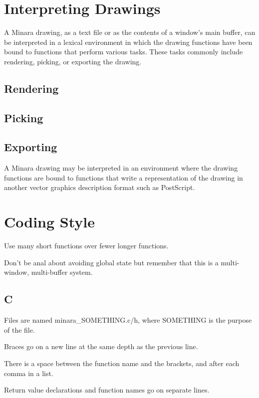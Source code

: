 \section{Interpreting Drawings}

A Minara drawing, as a text file or as the contents of a window's main buffer, can be interpreted in a lexical environment in which the drawing functions have been bound to functions that perform various tasks. These tasks commonly include rendering, picking, or exporting the drawing.

\subsection{Rendering}

\subsection{Picking}

\subsection{Exporting}

A Minara drawing may be interpreted in an environment where the drawing functions are bound to functions that write a representation of the drawing in another vector graphics description format such as PostScript.


\section{Coding Style}

Use many short functions over fewer longer functions.

Don't be anal about avoiding global state but remember that this is a multi-window, multi-buffer system.

\subsection{C}

Files are named minara_SOMETHING.c/h, where SOMETHING is the purpose of the file. 

Braces go on a new line at the same depth as the previous line.

There is a space between the function name and the brackets, and after each comma in a list.

Return value declarations and function names go on separate lines.

